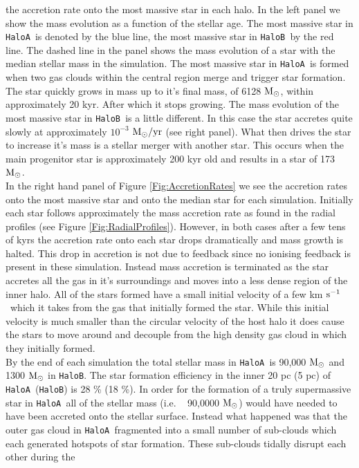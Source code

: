 \documentclass[graphics, twocolumn, usenatbib]{mn2e}
\newcommand{\kms} {km $\rm{s^{-1}}$}
\newcommand{\msolar} {$\rm{M_{\odot}}~$}
\newcommand{\msolarc} {$\rm{M_{\odot}}$}
\newcommand{\msolaryr} {$\rm{M_{\odot}/yr}~$}
\newcommand{\ha} {\texttt{HaloA~}}
\newcommand{\hb} {\texttt{HaloB~}}
\newcommand{\hbc} {\texttt{HaloB}}
\begin{document}
the accretion rate onto the most massive star in each halo. In the left panel we show the mass
evolution as a function of the stellar age. The most massive star in \ha is denoted by the blue line,
the most massive star in \hb by the red line. The dashed line in the panel shows the mass evolution
of a star with the median stellar mass in the simulation. The most massive star in \ha is formed
when two gas clouds within the central region merge and trigger star formation. The star quickly
grows in mass up to it's final mass, of 6128 \msolarc, within approximately 20 kyr. After which
it stops growing. The mass evolution of the most massive star in
\hb is a little different. In this case the star accretes quite slowly at approximately $10^{-3}$
\msolaryr (see right panel). What then drives the star to increase it's mass is a stellar merger
with another star. This occurs when the main progenitor star is approximately 200 kyr old and
results in a star of 173 \msolarc. \\
\indent In the right hand panel of Figure \ref{Fig:AccretionRates} we see the accretion rates onto
the most massive star and onto the median star for each simulation. Initially each star follows approximately the mass accretion rate as found in the radial profiles (see Figure \ref{Fig:RadialProfiles}).
However, in both cases after a few tens of kyrs the accretion rate onto each star drops dramatically and mass growth is halted. This drop in accretion is not due to feedback since no ionising feedback
is present in these simulation. Instead mass accretion is terminated as the star accretes all the gas in it's surroundings and moves into a less dense region of the inner halo. All of the stars formed have a small initial velocity of a few \kms \ which it takes from the gas that initially formed the star. While this 
initial velocity is much smaller than the circular
velocity of the host halo it does cause the stars to move around and decouple from the high density gas cloud in which they initially formed. \\
\indent By the end of each simulation the total stellar mass in \ha is 90,000 \msolar and 1300
\msolar in \hbc. The star formation efficiency in the inner 20 pc (5 pc) of \ha (\hbc) is 28 \%
(18 \%).  In order for the formation of a truly supermassive star in \ha all of the stellar mass
(i.e. ~ 90,0000 \msolarc) would have needed to have been accreted onto the stellar surface. Instead
what happened was that the outer gas cloud in \ha fragmented into a small number of sub-clouds which
each generated hotspots of star formation. These sub-clouds tidally disrupt each other during the
\end{document}
